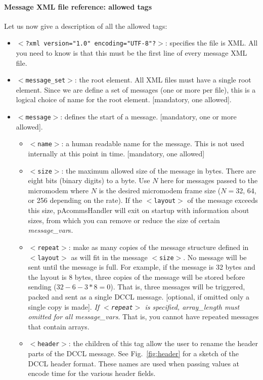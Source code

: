 \documentclass[11pt, letterpaper, oneside]{memoir}
\newcommand{\xmltag}[1]{\texttt{$<$#1$>$}}
\begin{document}
\paragraph{Message XML file reference: allowed tags} Let us now give a description of all the allowed tags:

\begin{itemize}
\item \xmltag{?xml version="1.0" encoding="UTF-8"?}: specifies the file is XML. All you need to know is that this must be the first line of every message XML file.
\item \xmltag{message\_set}: the root element. All XML files must have a single root element. Since we are define a set of messages (one or more per file), this is a logical choice of name for the root element. [mandatory, one allowed].
\item \xmltag{message}: defines the start of a message. [mandatory, one or more allowed].
\begin{itemize}
\item \xmltag{name}: a human readable name for the message. This is not used internally at this point in time. [mandatory, one allowed]
\item \xmltag{size}: the maximum allowed size of the message in bytes. There are eight bits (binary digits) to a byte. Use $N$ here for messages passed to the micromodem where $N$ is the desired micromodem frame size ($N=$32, 64, or 256 depending on the rate). If the \xmltag{layout} of the message exceeds this size, pAcommsHandler will exit on startup with information about sizes, from which you can remove or reduce the size of certain \textit{message\_var}s.
\item \xmltag{repeat}: make as many copies of the message structure defined in \xmltag{layout} as will fit in the message \xmltag{size}. No message will be sent until the message is full. For example, if the message is 32 bytes and the layout is 8 bytes, three copies of the message will be stored before sending ($32-6-3*8 = 0$). That is, three messages will be triggered, packed and sent as a single DCCL message. [optional, if omitted only a single copy is made]. \textit{If \xmltag{repeat} is specified, \textit{array\_length} must omitted for all \textit{message\_vars}}. That is, you cannot have repeated messages that contain arrays.
\item \xmltag{header}: the children of this tag allow the user to rename the header parts of the DCCL message. See Fig.~\ref{fig:header} for a sketch of the DCCL header format. These names are used when passing values at encode time for the various header fields.

\end{itemize}
\end{itemize}
\end{document}
